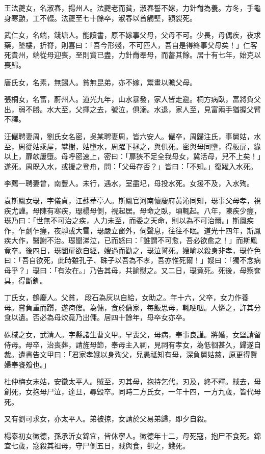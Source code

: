 \begin{pinyinscope}
王法夔女，名淑春，揚州人。法夔老而貧，淑春誓不嫁，力針黹為養。方冬，手龜身寒顫，工不輟。法夔至七十餘卒，淑春以首觸壁，額裂死。

武仁女，名端，錢塘人。能讀書，原不嫁事父母，父母不可。少長，母偶疾，夜求藥，墜樓，折脊，則喜曰：「吾今形殘，不可匹人，吾自是得終事父母矣！」仁客死貴州，端從母迎喪，至則貲已盡，力針黹奉母，而蓄其餘。居十有七年，始克以喪歸。

唐氏女，名素，無錫人。貧無昆弟，亦不嫁，鬻畫以贍父母。

張桐女，名富，蔚州人。道光九年，山水暴發，家人皆走避。桐方病臥，富將負父出，弱不勝。水大至，父揮之去，號泣，俱溺。水退，家人至，見富兩手猶握父臂不釋。

汪儼聘妻周，劉氏女名密，吳某聘妻周，皆六安人。儼卒，周歸注氏，事舅姑，水至，周從姑乘屋，攀樹，姑墮水，周躍下拯之，與俱死。密與母同墮，得板扉，緣以上，扉欹屢墮。母呼密速上，密曰：「扉狹不足全我母女，冀活母，兒不上矣！」遂死。周既入水，或援之登舟，問：「父母存否？」皆曰：「不知。」復躍入水死。

李薦一聘妻曾，南豐人。未行，遇水，室盡圮，母投水死。女援不及，入水殉。

袁斯鳳女璱，字儀貞，江蘇華亭人。斯鳳官河南懷慶府黃沁同知，璱事父母孝，視疾尤謹。母陳有寒疾，璱榻母側，視起居。母命之臥，頃輒起。八年，陳疾少瘥，璱乃曰：「世無不可治之疾，人力未至，而委之天命，則以為不可治爾。」斯鳳疾作，乍劇乍瘥，夜靜或大雪，璱嚴立窗外，伺聲息，往往不眠。道光十四年，斯鳳疾大作，醫謝不治。璱聞涕泣，已而怒曰：「誰謂不可愈，吾必欲愈之！」而斯鳳竟卒。後四日，璱闔扉欲自經，嫂過而勸之，璱泣誓死。嫂喻以殺身非孝，璱作色曰：「吾自欲死，此時雖孔子、硃子以吾為不孝，吾亦惟死爾！」嫂曰：「獨不念病母乎？」璱曰：「有汝在。」乃告其母，共諭慰之。又二日，璱竟死。死後，母察奩具，得斷釧。

丁氏女，鶴慶人。父貧，段石為灰以自給，女助之。年十六，父卒，女力作養母。嘗負重而躓，遂痀僂。為傭，食於傭家，每飯思母，輒哽咽。人憐之，許其分食以遺。否必為母炊竟乃出傭。居四十餘年，母卒女亦卒。

硃棫之女，武清人。字縣諸生曹文甲。早喪父，母病，奉事良謹。將婚，女堅請留侍母。母卒，治喪葬，請旌母節，奉母主入祠，見祠有孝女，為低徊甚久，歸遂自裁。遺書告文甲曰：「君家孝娥以身殉父，兒愚祗知有母，深負舅姑慈，原更得賢婦奉饔飧也。」

杜仲梅女末姑，安徽太平人。賊至，刃其母，抱持乞代，刃及，終不釋。賊去，母創死，女抱母尸泣，達旦，尋毀卒。同時二方氏女，一年十四，一方九歲，皆代母死。

又有劉可求女，亦太平人。弟被掠，女請於父易弟歸，即夕自殺。

楊泰初女徽德，孫承沂女錦宜，皆休寧人。徽德年十二，母死寇，抱尸不食死。錦宜七歲，寇殺其祖母，守尸側五日，賊與食，卻之，餓死。


\end{pinyinscope}
